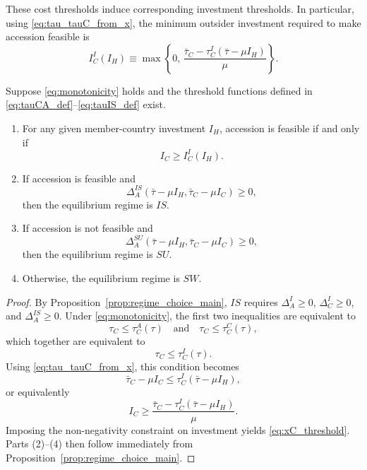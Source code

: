 These cost thresholds induce corresponding investment thresholds. In
particular, using \eqref{eq:tau_tauC_from_x}, the minimum outsider investment
required to make accession feasible is
\begin{equation}
I_C^{I}(I_H)
\equiv
\max\left\{
0,\,
\frac{\bar\tau_C-\tau_C^{I}(\bar\tau-\mu I_H)}{\mu}
\right\}.
\label{eq:xC_threshold}
\end{equation}

\begin{proposition}
Suppose \eqref{eq:monotonicity} holds and the threshold functions defined in
\eqref{eq:tauCA_def}--\eqref{eq:tauIS_def} exist.

\begin{enumerate}
    \item For any given member-country investment $I_H$, accession is feasible
    if and only if
    \[
    I_C \ge I_C^I(I_H).
    \]

    \item If accession is feasible and
    \[
    \Delta_A^{IS}(\bar\tau-\mu I_H,\bar\tau_C-\mu I_C)\ge 0,
    \]
    then the equilibrium regime is $IS$.

    \item If accession is not feasible and
    \[
    \Delta_A^{SU}(\bar\tau-\mu I_H,\bar\tau_C-\mu I_C)\ge 0,
    \]
    then the equilibrium regime is $SU$.

    \item Otherwise, the equilibrium regime is $SW$.
\end{enumerate}
\label{prop:investment_thresholds}
\end{proposition}

\begin{proof}
By Proposition~\ref{prop:regime_choice_main}, $IS$ requires $\Delta_A^I\ge 0$,
$\Delta_C^I\ge 0$, and $\Delta_A^{IS}\ge 0$. Under
\eqref{eq:monotonicity}, the first two inequalities are equivalent to
\[
\tau_C\le \tau_C^A(\tau)
\quad\text{and}\quad
\tau_C\le \tau_C^C(\tau),
\]
which together are equivalent to
\[
\tau_C\le \tau_C^I(\tau).
\]
Using \eqref{eq:tau_tauC_from_x}, this condition becomes
\[
\bar\tau_C-\mu I_C \le \tau_C^{I}(\bar\tau-\mu I_H),
\]
or equivalently
\[
I_C \ge
\frac{\bar\tau_C-\tau_C^{I}(\bar\tau-\mu I_H)}{\mu}.
\]
Imposing the non-negativity constraint on investment yields
\eqref{eq:xC_threshold}. Parts (2)--(4) then follow immediately from
Proposition~\ref{prop:regime_choice_main}.
\end{proof}

